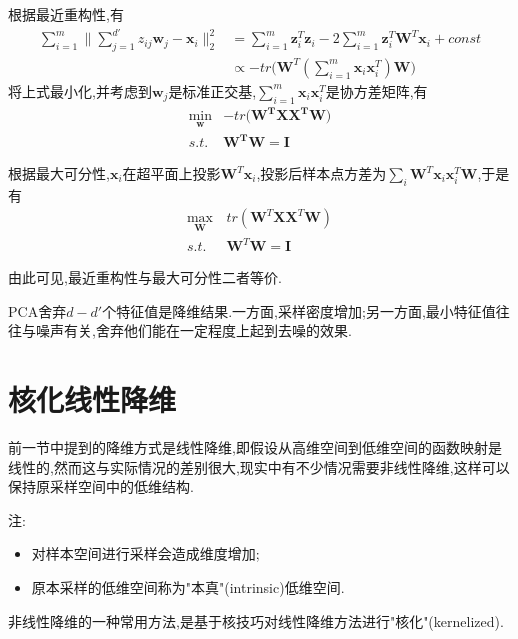 根据最近重构性,有
\begin{equation}\begin{split}
\sum_{i=1}^m\|\sum_{j=1}^{d'}z_{ij}\mathbf{w}_j-\mathbf{x}_i\|_2^2&=\sum_{i=1}^m\mathbf{z}_i^T\mathbf{z}_i-2\sum_{i=1}^m\mathbf{z}_i^T\mathbf{W}^T\mathbf{x}_i+const\\&\propto -tr\Big(\mathbf{W}^T(\sum_{i=1}^m\mathbf{x}_i\mathbf{x}_i^T)\mathbf{W}\Big)
\end{split}\end{equation}
将上式最小化,并考虑到$\mathbf{w}_j$是标准正交基,$\sum_{i=1}^m\mathbf{x}_i\mathbf{x}_i^T$是协方差矩阵,有
\begin{equation}\begin{split}
\min_\mathbf{w}&-tr\Big(\mathbf{W^TXX^TW}\Big)\\
s.t.& \mathbf{W^TW=I}
\end{split}\end{equation}

根据最大可分性,$\mathbf{x}_i$在超平面上投影$\mathbf{W}^T\mathbf{x}_i$,投影后样本点方差为$\sum_i\mathbf{W}^T\mathbf{x}_i\mathbf{x}_i^T\mathbf{W}$,于是有
\begin{equation}\begin{split}
\max_{\mathbf{W}}&\,tr(\mathbf{W}^T\mathbf{XX}^T\mathbf{W})\\
s.t.&\,\mathbf{W}^T\mathbf{W=I}
\end{split}\end{equation}

由此可见,最近重构性与最大可分性二者等价.

PCA舍弃$d-d'$个特征值是降维结果.一方面,采样密度增加;另一方面,最小特征值往往与噪声有关,舍弃他们能在一定程度上起到去噪的效果.

\section{核化线性降维}

前一节中提到的降维方式是线性降维,即假设从高维空间到低维空间的函数映射是线性的,然而这与实际情况的差别很大,现实中有不少情况需要非线性降维,这样可以保持原采样空间中的低维结构.

注:
\begin{itemize}
\item 对样本空间进行采样会造成维度增加;
\item 原本采样的低维空间称为"本真"(intrinsic)低维空间.
\end{itemize}

非线性降维的一种常用方法,是基于核技巧对线性降维方法进行"核化"(kernelized).

